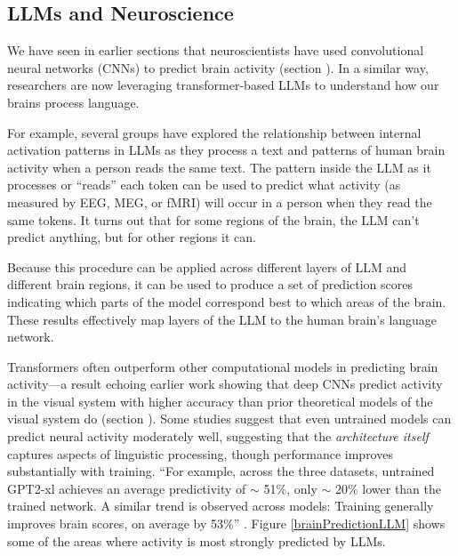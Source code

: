 
\subsection{LLMs and Neuroscience}

We have seen in earlier sections that neuroscientists have used convolutional
neural networks (CNNs) to predict brain activity (section
). In a similar way, researchers are now leveraging
transformer-based LLMs to understand how our brains process language. 

For example, several groups \cite{pasquiou2022neural, schrimpf2021neural,
caucheteux2022brains} have explored the relationship between internal
activation patterns in LLMs as they process a text and patterns of human brain
activity when a person reads the same text. The pattern inside the LLM as it processes or ``reads'' each token can be used to predict what activity (as measured by EEG, MEG, or fMRI) will occur in a person when they read the same tokens. It turns out that for some regions of the brain, the LLM can't predict anything, but for other regions it can. 

Because this procedure can be applied across different layers of LLM and
different brain regions, it can be used to produce  a set of prediction scores
indicating which parts of the model correspond best to which areas of the
brain. These results effectively map layers of the LLM to the human brain's language
network.

Transformers often outperform other computational models in predicting brain
activity---a result echoing earlier work showing that deep CNNs predict
activity in the visual system with higher accuracy than prior theoretical
models of the visual system do (section ). Some
studies suggest that even untrained models can predict neural activity
moderately well, suggesting that the \emph{architecture itself} captures
aspects of linguistic processing, though performance improves substantially
with training. ``For example, across the three datasets, untrained GPT2-xl
achieves an average predictivity of $\sim$ 51\%, only $\sim$ 20\% lower than
the trained network. A similar trend is observed across models: Training
generally improves brain scores, on average by 53\%''
\cite{schrimpf2021neural}. Figure \ref{brainPredictionLLM} shows some of the
areas where activity is most strongly predicted by LLMs.

